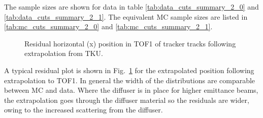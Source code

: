 The sample sizes are shown for data in table \ref{tab:data_cuts_summary_2_0} and
\ref{tab:data_cuts_summary_2_1}. The equivalent MC sample sizes are listed in 
\ref{tab:mc_cuts_summary_2_0} and \ref{tab:mc_cuts_summary_2_1}.


\let\splitcell\undefined

\let\splitcell\undefined

\let\splitcell\undefined

\begin{figure}[!tbh]
    \centering
    {Residual horizontal (x) position in TOF1 of tracker tracks following extrapolation from TKU. \label{fig:tof1_extrapolated_x}}
\end{figure}

%

A typical residual plot is shown in Fig.~\ref{fig:tof1_extrapolated_x} for the extrapolated position following extrapolation to TOF1.
In general the width of the distributions are comparable between MC and data. Where the diffuser is in place for higher emittance beams, the extrapolation goes through the diffuser material so the residuals are wider, owing to the increased scattering from the diffuser.



